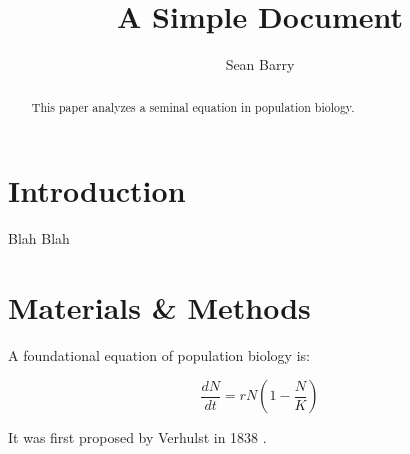 \documentclass[12pt]{article}
\title{A Simple Document}
\author{Sean Barry}
\date{}
\begin{document}
    \maketitle
    
    \begin{abstract}
    This paper analyzes a seminal equation in population biology.
    \end{abstract}
    
    \section{Introduction}
    Blah Blah
    
    \section{Materials \& Methods}
    
    A foundational equation of population biology is:
    
    \begin{equation}
    \frac{dN}{dt} = r N (1 - \frac{N}{K})
    \end{equation}
    
    It was first proposed by Verhulst in 1838 \cite{verhulst1838notice}.
    
    
    
    
    
\end{document}
